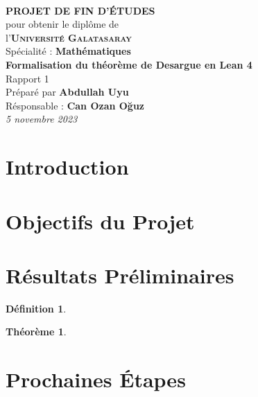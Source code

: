 \documentclass[12pt, oneside]{memoir}
\newtheorem{theorem}{Théorème}
\theoremstyle{definition}
\newtheorem{definition}{Définition}
\begin{document}
\thispagestyle{empty}
\vspace*{\fill}
\begin{center}
   \\
  \vspace{1cm}
  \large{\textbf{PROJET DE FIN D'ÉTUDES}} \\
  \vspace{0.5cm}
  {\small pour obtenir le diplôme de} \\
  \vspace{0.5cm}
  l'\textsc{\textbf{Université Galatasaray}} \\
  {\small Spécialité : \textbf{Mathématiques}} \\
  \vspace{2.25cm}
  {\Large\textbf{Formalisation du théorème de Desargue en Lean 4}}\\
  Rapport 1 \\
  \vspace{1.25cm}
  Préparé par \textbf{Abdullah Uyu} \\
  Résponsable : \textbf{Can Ozan Oğuz} \\
  \vspace{2.25cm}
  \textit{5 novembre 2023}
\end{center}
\vspace*{\fill}
\clearpage
{}
\section*{Introduction}
\lipsum[1]
\section*{Objectifs du Projet}
\lipsum[2]
\section*{Résultats Préliminaires}
\lipsum[3]
\begin{definition}
\end{definition}
\begin{theorem}
\end{theorem}
\section*{Prochaines Étapes}
\lipsum[11]
\end{document}
